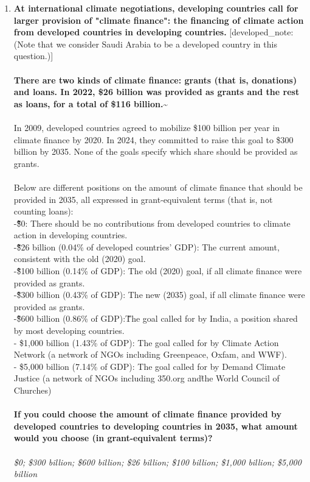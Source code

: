 \begin{enumerate}[resume]
\item  \label{q:ncqg_full} \textbf{At international climate negotiations, developing countries call for larger provision of "climate finance": the financing of climate action from developed countries in developing countries.} [developed\_note: (Note that we consider Saudi Arabia to be a developed country in this question.)]\\\\\textbf{There are two kinds of climate finance: grants (that is, donations) and loans. In 2022, \$26 billion was provided as grants and the rest as loans, for a total of \$116 billion.\~}\\\\In 2009, developed countries agreed to mobilize \$100 billion per year in climate finance by 2020. In 2024, they committed to raise this goal to \$300 billion by 2035. None of the goals specify which share should be provided as grants.\\\\Below are different positions on the amount of climate finance that should be provided in 2035, all expressed in grant-equivalent terms (that is, not counting loans):\\-\~ \~ \~ \~ \$0: There should be no contributions from developed countries to climate action in developing countries.\\-\~ \~ \~ \$26 billion (0.04\% of developed countries' GDP): The current amount, consistent with the old (2020) goal.\\-\~ \~ \$100 billion (0.14\% of GDP): The old (2020) goal, if all climate finance were provided as grants.\\-\~ \~ \$300 billion (0.43\% of GDP): The new (2035) goal, if all climate finance were provided as grants.\\-\~ \~ \$600 billion (0.86\% of GDP):\~The goal called for by India, a position shared by most developing countries.\\- \$1,000 billion (1.43\% of GDP): The goal called for by Climate Action Network (a network of NGOs including Greenpeace, Oxfam, and WWF).\\- \$5,000 billion (7.14\% of GDP): The goal called for by Demand Climate Justice (a network of NGOs including 350.org and\~the World Council of Churches)\\\\\textbf{If you could choose the amount of climate finance provided by developed countries to developing countries in 2035, what amount would you choose (in grant-equivalent terms)?}\\ [\textit{Figure \ref{fig:ncqg_full}}; 
\verb|ncqg_full|]
  \\ \textit{\$0; \$300 billion; \$600 billion; \$26 billion; \$100 billion; \$1,000 billion; \$5,000 billion}


\end{enumerate}
